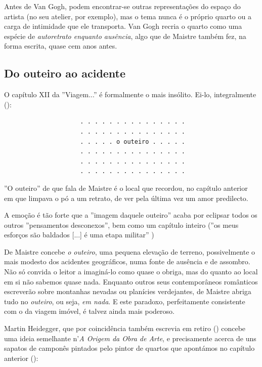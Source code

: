\documentclass[12pt]{article}
\begin{document}
Antes de Van Gogh, podem encontrar-se outras representações do espaço
do artista (no seu atelier, por exemplo), mas o tema nunca é o próprio
quarto ou a carga de intimidade que ele transporta. Van Gogh recria o
quarto como uma espécie de \emph{autoretrato enquanto ausência}, algo
que de Maistre também fez, na forma escrita, quase cem anos antes.

\subsection{Do outeiro ao acidente}

O capítulo XII da ''Viagem...'' é formalmente o mais insólito. Ei-lo,
integralmente (\cite[p.36]{demaistre}):

\begin{center}
\begin{verbatim}
                     . . . . . . . . . . . . . . .
                     . . . . . . . . . . . . . . .
                     . . . . . o outeiro . . . . .
                     . . . . . . . . . . . . . . .
                     . . . . . . . . . . . . . . .
                     . . . . . . . . . . . . . . .
\end{verbatim}
\end{center}

''O outeiro'' de que fala de Maistre é o local que recordou, no
capítulo anterior em que limpava o pó a um retrato, de ver pela última
vez um amor predilecto.

A emoção é tão forte que a ''imagem daquele outeiro'' acaba por
eclipsar todos os outros ''pensamentos desconexos'', bem como um
capítulo inteiro (''os meus esforços são baldados [...] é uma etapa
militar'' \cite[p.36,p.39]{demaistre})

De Maistre concebe \emph{o outeiro}, uma pequena elevação de terreno,
possivelmente o mais modesto dos acidentes geográficos, numa fonte de
ausência e de assombro. Não só convida o leitor a imaginá-lo como
quase o obriga, mas do quanto ao local em si não sabemos quase
nada. Enquanto outros seus contemporâneos românticos escreverão sobre
montanhas nevadas ou planícies verdejantes, de Maistre abriga tudo no
\emph{outeiro}, ou seja, \emph{em nada}. E este paradoxo, perfeitamente
consistente com o da viagem imóvel, é talvez ainda mais poderoso.

Martin Heidegger, que por coincidência também escrevia em retiro
(\cite{heideggerhut}) concebe uma ideia semelhante n'\emph{A Origem da
  Obra de Arte}, e precisamente acerca de uns sapatos de camponês
pintados pelo pintor de quartos que apontámos no capítulo anterior
(\cite[p.24]{heidegger}):
\end{document}
